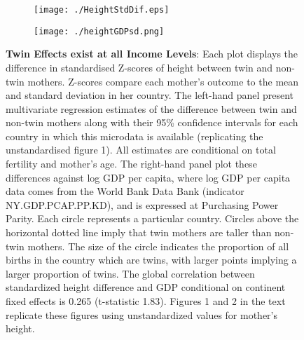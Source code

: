 \documentclass{nature}
\begin{document}
\begin{linenumbers}
\begin{spacing}{1}
\clearpage

\begin{figure}[htpb!]
\begin{subfigure}{.5\textwidth}
  \texttt{[image: ./HeightStdDif.eps]}
\end{subfigure}%
\begin{subfigure}{.5\textwidth}
  \texttt{[image: ./heightGDPsd.png]}
\end{subfigure}%
\vspace{5mm}
\caption{\textbf{Twin Effects exist at all Income Levels}: {\footnotesize Each plot displays the difference in standardised Z-scores of height between twin and non-twin mothers. Z-scores compare each mother's outcome to the mean and standard deviation in her country.  The left-hand panel present multivariate regression estimates of the difference between twin and non-twin mothers along with their 95\% confidence intervals for each country in which this microdata is available (replicating the unstandardised figure 1).  All estimates are conditional on total fertility and mother's age.  The right-hand panel plot these differences against log GDP per capita, where log GDP per capita data comes from the World Bank Data Bank (indicator NY.GDP.PCAP.PP.KD), and is expressed at Purchasing Power Parity.  Each circle represents a particular country.  Circles above the horizontal dotted line imply that twin mothers are taller than non-twin mothers. The size of the circle indicates the proportion of all births in the country which are twins, with larger points implying a larger proportion of twins. The global correlation between standardized height difference and GDP conditional on continent fixed effects is 0.265 (t-statistic 1.83). Figures 1 and 2 in the text replicate these figures using unstandardized values for mother's height.}}
\end{figure}


\end{spacing}
\end{linenumbers}
\end{document}
